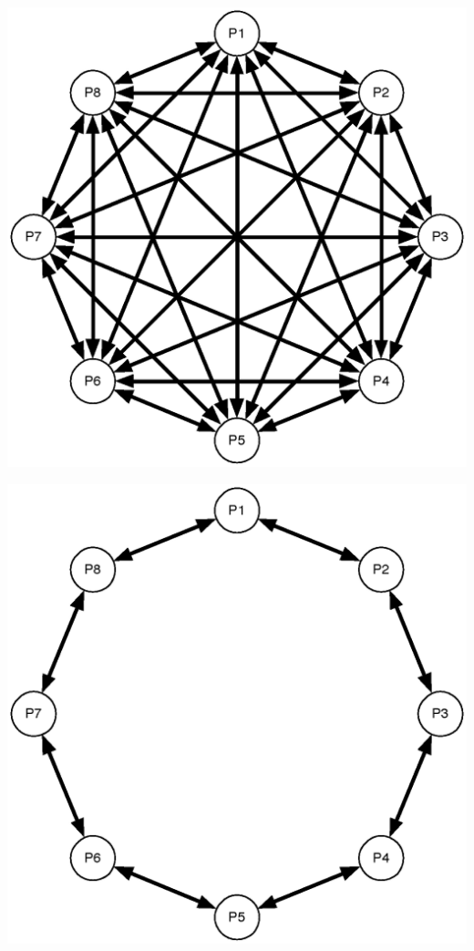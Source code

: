 \documentclass{csfourzero}
\newenvironment{Figure}
  {\par\medskip\noindent\minipage{\linewidth}}
  {\endminipage\par\medskip}
\begin{document}
\begin{multicols}{3}
  \begin{Figure}
    \centering
    \includegraphics[width=\linewidth]{global_best_topology.eps}\label{fig:global_best_topology}
  \end{Figure}

  \begin{Figure}
    \centering
    \includegraphics[width=\linewidth]{ring_topology.eps}\label{fig:ring_topology}
  \end{Figure}


\end{multicols}
\end{document}
